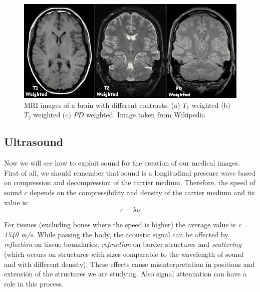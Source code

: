 \begin{figure}[htb] %
   \centering
   \includegraphics[width=0.50\linewidth]{images/mri.jpg}
   \caption[MRI of human brain]{MRI images of a brain with different contrasts. (a) $T_{1}$ weighted (b) $T_{2}$ weighted (c) $PD$ weighted. Image taken from Wikipedia}
   \label{fig:brainMRI}
\end{figure}

\subsection{Ultrasound}
Now we will see how to exploit sound for the creation of our medical images. First of all, we should remember that sound is a longitudinal pressure wave based on compression and decompression of the carrier medium. Therefore, the speed of sound $c$ depends on the compressibility and density of the carrier medium and its value is:
\begin{equation}
 c = \lambda \nu
\end{equation}

For tissues (excluding bones where the speed is higher) the average value is \textit{c = 1540 m/s}. While passing the body, the acoustic signal can be affected by \textit{reflection} on tissue boundaries, \textit{refraction} on border structures and \textit{scattering} (which occurs on structures with sizes comparable to the wavelength of sound and with different density). These effects cause misinterpretation in positions and extension of the structures we are studying. Also signal attenuation can have a role in this process.\\

